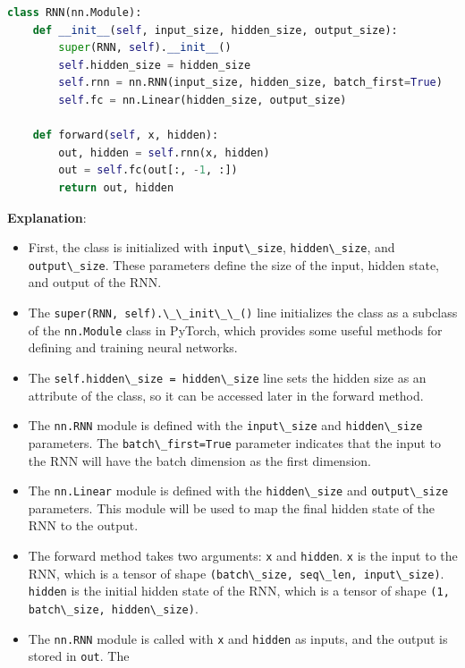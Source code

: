 \begin{lstlisting}[language=Python]
class RNN(nn.Module):
    def __init__(self, input_size, hidden_size, output_size):
        super(RNN, self).__init__()
        self.hidden_size = hidden_size
        self.rnn = nn.RNN(input_size, hidden_size, batch_first=True)
        self.fc = nn.Linear(hidden_size, output_size)

    def forward(self, x, hidden):
        out, hidden = self.rnn(x, hidden)
        out = self.fc(out[:, -1, :])
        return out, hidden
\end{lstlisting}

\textbf{Explanation}:

\begin{itemize}
\item
  First, the class is initialized with
  \lstinline{input\_size},
  \lstinline{hidden\_size}, and
  \lstinline{output\_size}. These parameters define the
  size of the input, hidden state, and output of the RNN.
\item
  The \lstinline{super(RNN, self).\_\_init\_\_()} line
  initializes the class as a subclass of the
  \lstinline{nn.Module} class in PyTorch, which provides
  some useful methods for defining and training neural networks.
\item
  The \lstinline{self.hidden\_size = hidden\_size} line
  sets the hidden size as an attribute of the class, so it can be
  accessed later in the forward method.
\item
  The \lstinline{nn.RNN} module is defined with the
  \lstinline{input\_size} and
  \lstinline{hidden\_size} parameters. The
  \lstinline{batch\_first=True} parameter indicates that
  the input to the RNN will have the batch dimension as the first
  dimension.
\item
  The \lstinline{nn.Linear} module is defined with the
  \lstinline{hidden\_size} and
  \lstinline{output\_size} parameters. This module will be
  used to map the final hidden state of the RNN to the output.
\item
  The forward method takes two arguments: \lstinline{x}
  and \lstinline{hidden}. \lstinline{x} is
  the input to the RNN, which is a tensor of shape
  \lstinline{(batch\_size, seq\_len, input\_size)}.
  \lstinline{hidden} is the initial hidden state of the
  RNN, which is a tensor of shape
  \lstinline{(1, batch\_size, hidden\_size)}.
\item
  The \lstinline{nn.RNN} module is called with
  \lstinline{x} and \lstinline{hidden} as
  inputs, and the output is stored in \lstinline{out}. The

\end{itemize}
